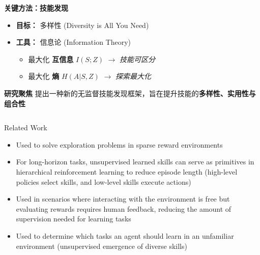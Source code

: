 \documentclass{beamer}
\begin{document}
\begin{frame}
\begin{columns}[T]
\begin{column}{0.5\textwidth}
            \textbf{关键方法：技能发现}
                \begin{itemize}
                    \item \textbf{目标：} 多样性 (Diversity is All You Need)
                    \item \textbf{工具：} 信息论 (Information Theory)
                    \begin{itemize}
                        \tiny
                        \item 最大化 \textbf{互信息} $I(S; Z)$ $\rightarrow$ \textit{技能可区分}
                        \item 最大化 \textbf{熵} $H(A|S, Z)$ $\rightarrow$ \textit{探索最大化}
                    \end{itemize}
                \end{itemize}
            
            \textbf{研究聚焦}
                提出一种新的无监督技能发现框架，旨在提升技能的\textbf{多样性、实用性与组合性}

         \end{column}
    \end{columns}

\end{frame}

\begin{frame}{Related Work}
	\footnotesize
	\begin{itemize}
		\item Used to solve exploration problems in sparse reward environments
		\vspace{0.2cm}
		\item For long-horizon tasks, unsupervised learned skills can serve as primitives in hierarchical reinforcement learning to reduce episode length (high-level policies select skills, and low-level skills execute actions)
		\vspace{0.2cm}
		\item Used in scenarios where interacting with the environment is free but evaluating rewards requires human feedback, reducing the amount of supervision needed for learning tasks\vspace{0.2cm}
		\item Used to determine which tasks an agent should learn in an unfamiliar environment (unsupervised emergence of diverse skills)
	\end{itemize}
\end{frame}
\end{document}

